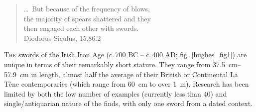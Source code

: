 \begin{quote}
\begin{flushright}
\ldots\ But because of the frequency of blows, \\
the majority of spears shattered and they\\
then engaged each other with swords.\\
{\footnotesize Diodorus Siculus, 15.86.2  }
\end{flushright}
\end{quote}
\vspace{2em}


\lettrine[nindent=0em,lines=3]{T}{he}  swords of the Irish Iron Age (c.\,700 BC – c.\,400 AD; fig. \ref{hughes_fig1}) are unique in terms of their remarkably short stature. They range from \SIrange[range-phrase= --]{37.5}{57.9}{\cm} in length, almost half the average of their British or Continental La Tène contemporaries (which range from \SI{60}{\cm} to over \SI{1}{\meter}). 
Research has been limited by both the low number of examples (currently less than \num{40}) and single/antiquarian nature of the finds, with only one sword from a dated context. 

